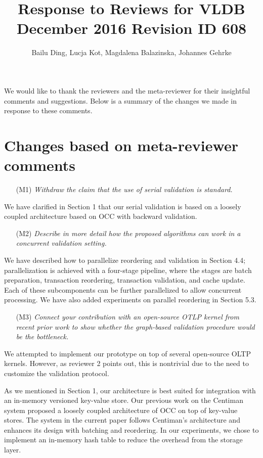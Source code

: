 \documentclass{article}
\begin{document}
\title{Response to Reviews for VLDB December 2016 Revision ID 608}
\author{Bailu Ding, Lucja Kot, Magdalena Balazinska, Johannes Gehrke}
\maketitle

We would like to thank the reviewers and the meta-reviewer for their insightful comments and suggestions. Below is a summary of the changes we made in response to these comments.

\section{Changes based on meta-reviewer comments}

\begin{itemize}
\item[(M1)] \emph{Withdraw the claim that the use of serial validation is standard. }
\end{itemize}
We have clarified in Section 1 that our serial validation is based on a loosely coupled architecture based on OCC with backward validation.

\begin{itemize}
\item[(M2)] \emph{Describe in more detail how the proposed algorithms can work in a concurrent validation setting. }
\end{itemize}
We have described how to parallelize reordering and validation in Section 4.4; parallelization is achieved with a four-stage pipeline, where the stages are batch preparation, transaction reordering, transaction validation, and cache update. Each of these subcomponents can be further parallelized to allow concurrent processing. We have also added experiments on parallel reordering in Section 5.3. 

\begin{itemize}
\item[(M3)]  \emph{Connect your contribution with an open-source OTLP kernel from recent prior work to show whether the graph-based validation procedure would be the bottleneck.}
\end{itemize}
We attempted to implement our prototype on top of several open-source OLTP kernels. However, as reviewer 2 points out, this is nontrivial due to the need to customize the validation protocol.

As we mentioned in Section 1, our architecture is best suited for integration with an in-memory versioned key-value store. Our previous work on the Centiman system proposed a loosely coupled architecture of OCC on top of key-value stores. The system in the current paper follows Centiman's architecture and enhances its design with batching and reordering. In our experiments, we chose to implement an in-memory hash table to reduce the overhead from the storage layer.
\end{document}

